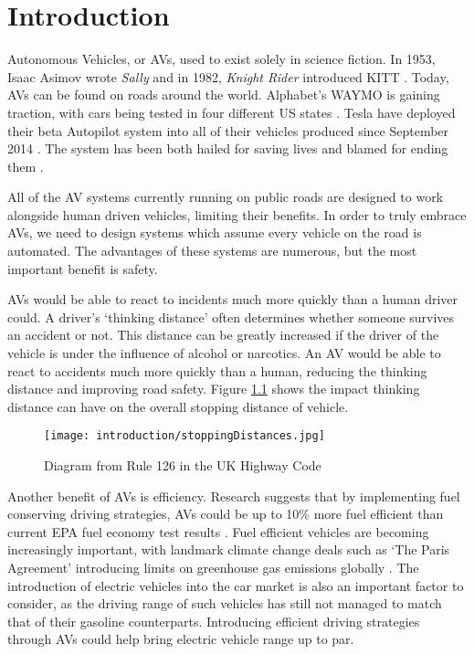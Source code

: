 \chapter{Introduction}
\label{cha:Introduction}

Autonomous Vehicles, or AVs, used to exist solely in science fiction. In 1953, Isaac Asimov wrote \emph{Sally} \citep{Asimov1953} and in 1982, \emph{Knight Rider} introduced KITT \citep{Kitt1982}. Today, AVs can be found on roads around the world. Alphabet's WAYMO is gaining traction, with cars being tested in four different US states \citep{Waymo2016}. Tesla have deployed their beta Autopilot system into all of their vehicles produced since September 2014 \citep{TeslaAutoPressKit}. The system has been both hailed for saving lives and blamed for ending them \citep{TeslaHospital} \citep{TeslaUnderInvestigation}.

All of the AV systems currently running on public roads are designed to work alongside human driven vehicles, limiting their benefits. In order to truly embrace AVs, we need to design systems which assume every vehicle on the road is automated. The advantages of these systems are numerous, but the most important benefit is safety.

AVs would be able to react to incidents much more quickly than a human driver could. A driver's `thinking distance' often determines whether someone survives an accident or not. This distance can be greatly increased if the driver of the vehicle is under the influence of alcohol or narcotics. An AV would be able to react to accidents much more quickly than a human, reducing the thinking distance and improving road safety. Figure \ref{fig:StoppingDistances} shows the impact thinking distance can have on the overall stopping distance of vehicle.

\begin{figure}[htb]
\centerline{
\texttt{[image: introduction/stoppingDistances.jpg]}
}
\caption{Diagram from Rule 126 in the UK Highway Code \citep{StoppingDistances}}
\label{fig:StoppingDistances}
\end{figure}

Another benefit of AVs is efficiency. Research suggests that by implementing fuel conserving driving strategies, AVs could be up to 10\% more fuel efficient than current EPA fuel economy test results \citep{Mersky2016}. Fuel efficient vehicles are becoming increasingly important, with landmark climate change deals such as `The Paris Agreement' introducing limits on greenhouse gas emissions globally \citep{Paris2016}. The introduction of electric vehicles into the car market is also an important factor to consider, as the driving range of such vehicles has still not managed to match that of their gasoline counterparts. Introducing efficient driving strategies through AVs could help bring electric vehicle range up to par.

